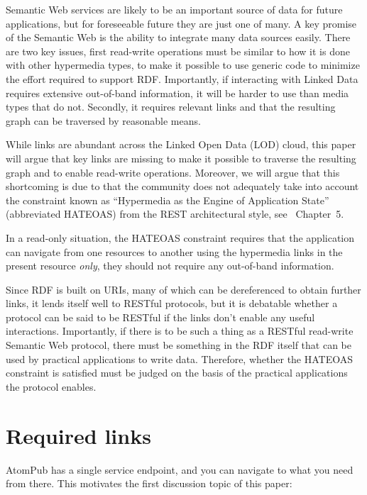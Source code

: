 \documentclass{llncs}
\begin{document}
Semantic Web services are likely to be an important source of data for
future applications, but for foreseeable future they are just one of many. A
key promise of the Semantic Web is the ability to integrate many data
sources easily. There are two key issues, first read-write operations
must be similar to how it is done with other hypermedia types, to make
it possible to use generic code to minimize the effort required to
support RDF. Importantly, if interacting with Linked Data requires
extensive out-of-band information, it will be harder to use than media
types that do not. Secondly, it requires relevant links and that the
resulting graph can be traversed by reasonable means.

While links are abundant across the Linked Open Data (LOD) cloud, this
paper will argue that key links are missing to make it possible to
traverse the resulting graph and to enable read-write
operations. Moreover, we will argue that this shortcoming is due to
that the community does not adequately take into account the
constraint known as ``Hypermedia as the Engine of Application State''
(abbreviated HATEOAS) from the REST architectural style, see
\cite{Fielding_2000_Architectural-Styles}~Chapter~5.

In a read-only situation, the HATEOAS constraint requires that the
application can navigate from one resources to another using the
hypermedia links in the present resource \emph{only}, they should not
require any out-of-band information.

Since RDF is built on URIs, many of which can be dereferenced to
obtain further links, it lends itself well to RESTful protocols, but
it is debatable whether a protocol can be said to be RESTful if the
links don't enable any useful interactions. Importantly, if there is
to be such a thing as a RESTful read-write Semantic Web protocol,
there must be something in the RDF itself that can be used by
practical applications to write data. Therefore, whether the HATEOAS
constraint is satisfied must be judged on the basis of the practical
applications the protocol enables.

\section{Required links}

AtomPub has a single service endpoint, and you can navigate to what
you need from there. This motivates the first discussion topic of this
paper:
\end{document}
